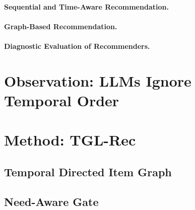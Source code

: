 \documentclass[10pt,twocolumn]{article}
\begin{document}
\paragraph{Sequential and Time-Aware Recommendation.}

\paragraph{Graph-Based Recommendation.}

\paragraph{Diagnostic Evaluation of Recommenders.}

\section{Observation: LLMs Ignore Temporal Order}


\section{Method: TGL-Rec}

\subsection{Temporal Directed Item Graph}

\subsection{Need-Aware Gate}
\end{document}

